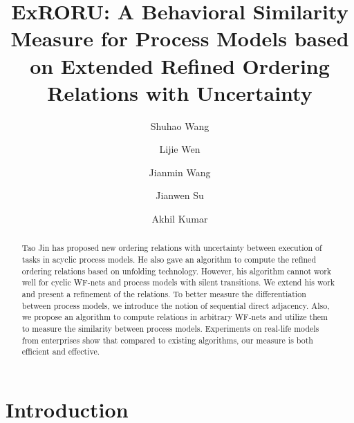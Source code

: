 \documentclass[dvips,...]{llncs}
\begin{document}
\frontmatter 
\pagestyle{headings}

\mainmatter
\title{ExRORU: A Behavioral Similarity Measure for Process Models based on Extended Refined Ordering Relations with Uncertainty}

\author[$1$]{Shuhao Wang}
\author[$1$]{Lijie Wen}
\author[$1$]{Jianmin Wang}
\author[$2$]{Jianwen Su}
\author[$3$]{Akhil Kumar}
\institute{}

\maketitle

\begin{abstract}
Tao Jin has proposed new ordering relations with uncertainty between execution of tasks in acyclic process models. He also gave an algorithm to compute the refined ordering relations based on unfolding technology. However, his algorithm cannot work well for cyclic WF-nets and process models with silent transitions. We extend his work and present a refinement of the relations. To better measure the differentiation between process models, we introduce the notion of sequential direct adjacency. Also, we propose an algorithm to compute relations in arbitrary WF-nets and utilize them to measure the similarity between process models. Experiments on real-life models from enterprises show that compared to existing algorithms, our measure is both efficient and effective.
\end{abstract}

\section{Introduction}\label{sec:introduction}
\end{document}

